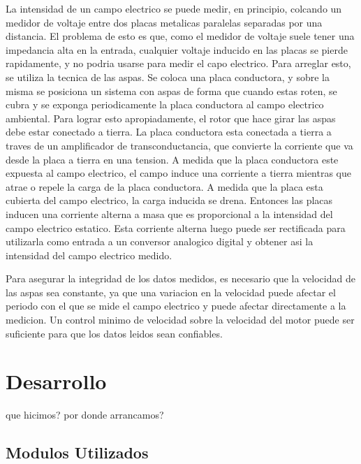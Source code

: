 \documentclass[a4paper]{article}
\begin{document}
\linebreak

La intensidad de un campo electrico se puede medir, en principio, colcando un medidor de voltaje entre dos placas metalicas paralelas separadas por una distancia. El problema de esto es que, como el medidor de voltaje suele tener una impedancia alta en la entrada, cualquier voltaje inducido en las placas se pierde rapidamente, y no podria usarse para medir el capo electrico. Para arreglar esto, se utiliza la tecnica de las aspas. Se coloca una placa conductora, y sobre la misma se posiciona un sistema con aspas de forma que cuando estas roten, se cubra y se exponga periodicamente la placa conductora al campo electrico ambiental. Para lograr esto apropiadamente, el rotor que hace girar las aspas debe estar conectado a tierra. La placa conductora esta conectada a tierra a traves de un amplificador de transconductancia, que convierte la corriente que va desde la placa a tierra en una tension. A medida que la placa conductora este expuesta al campo electrico, el campo induce una corriente a tierra mientras que atrae o repele la carga de la placa conductora. A medida que la placa esta cubierta del campo electrico, la carga inducida se drena. Entonces las placas inducen una corriente alterna a masa que es proporcional a la intensidad del campo electrico estatico. Esta corriente alterna luego puede ser rectificada para utilizarla como entrada a un conversor analogico digital y obtener asi la intensidad del campo electrico medido.

\linebreak

Para asegurar la integridad de los datos medidos, es necesario que la velocidad de las aspas sea constante, ya que una variacion en la velocidad puede afectar el periodo con el que se mide el campo electrico y puede afectar directamente a la medicion. Un control minimo de velocidad sobre la velocidad del motor puede ser suficiente para que los datos leidos sean confiables.


\section{Desarrollo} %
\label{sec:desarrollo}

que hicimos? por donde arrancamos?


\subsection{Modulos Utilizados} %
\label{sub:modulos_utilizados}
\end{document}
